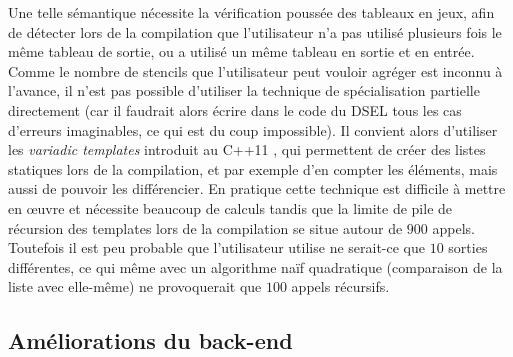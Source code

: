 Une telle sémantique nécessite la vérification poussée des tableaux en jeux, afin de détecter lors de la compilation que l'utilisateur n'a pas utilisé plusieurs fois le même tableau de sortie, ou a utilisé un même tableau en sortie et en entrée. Comme le nombre de stencils que l'utilisateur peut vouloir agréger est inconnu à l'avance, il n'est pas possible d'utiliser la technique de spécialisation partielle directement (car il faudrait alors écrire dans le code du DSEL tous les cas d'erreurs imaginables, ce qui est du coup impossible). Il convient alors d'utiliser les \emph{variadic templates} introduit au \textsf{C++11} \cite{Art6}, qui permettent de créer des listes statiques lors de la compilation, et par exemple d'en compter les éléments, mais aussi de pouvoir les différencier. En pratique cette technique est difficile à mettre en œuvre et nécessite beaucoup de calculs tandis que la limite de pile de récursion des templates lors de la compilation se situe autour de $900$ appels. Toutefois il est peu probable que l'utilisateur utilise ne serait-ce que $10$ sorties différentes, ce qui même avec un algorithme naïf quadratique (comparaison de la liste avec elle-même) ne provoquerait que $100$ appels récursifs.


\subsection{Améliorations du back-end}
\label{sec:amelior_backend}

